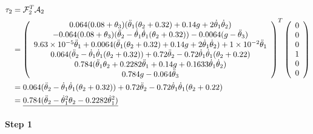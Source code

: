 \documentclass[]{scrreprt}
\newcommand{\myvec}[1]{\left(\begin{array}{c}#1\end{array}\right)}
\begin{document}
\begin{align*}
\tau_2 &= \mathcal{F}_2^T\mathcal{A}_2\\
& = \myvec{0.064(0.08+\theta_3)(\tddot{1}(\theta_2+0.32)+0.14g+2\tdot{1}\tdot{2})  \\
	-0.064(0.08+\theta_3)(\tddot{2}-\tdot{1}\tdot{1}(\theta_2+0.32))-0.0064(g-\tddot{3})\\
	\num{+9.63e-5}\tddot{1}+0.0064(\tddot{1}(\theta_2+0.32)+0.14g+2\tdot{1}\tdot{2})+\num{+1e-2}\tddot{1}\\
	0.064(\tddot{2}-\tdot{1}\tdot{1}(\theta_2+0.32))+0.72\tddot{2}-0.72\tdot{1}\tdot{1}(\theta_2+0.22)\\
	0.784(\tddot{1}\theta_2+0.2282\tddot{1}+0.14g+0.1633\tdot{1}\tdot{2})\\
	0.784g-0.064\tddot{3}}^T
\myvec{0\\0\\0\\1\\0\\0}\\
& = {0.064(\tddot{2}-\tdot{1}\tdot{1}(\theta_2+0.32))+0.72\tddot{2}-0.72\tdot{1}\tdot{1}(\theta_2+0.22)}\\
& = \underline{0.784(\tddot{2}-\tdot{1}^2\theta_2-0.2282\tdot{1}^2)}
\end{align*}

\paragraph{Step 1}
\end{document}
